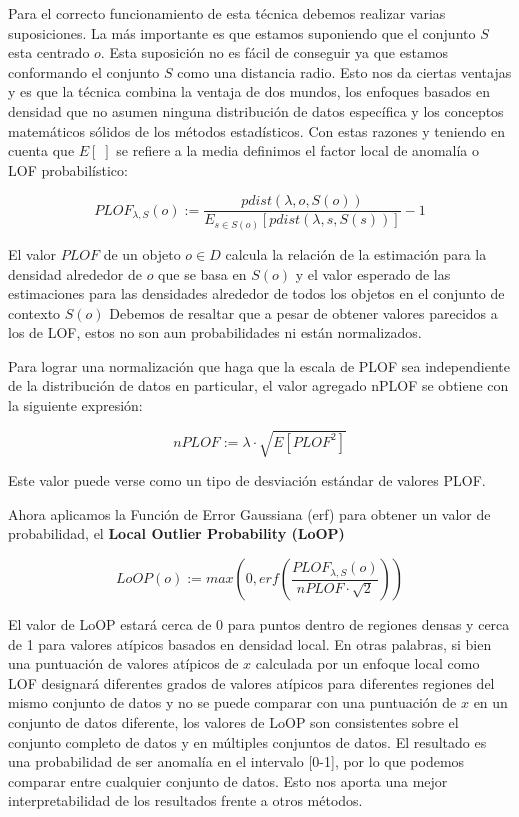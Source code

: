 Para el correcto funcionamiento de esta técnica debemos realizar varias suposiciones.
La más importante es que estamos suponiendo que el conjunto $S$ esta centrado $o$.
Esta suposición no es fácil de conseguir ya que estamos conformando el conjunto $S$
como una distancia radio. Esto nos da ciertas ventajas y es que la técnica combina
la ventaja de dos mundos, los enfoques basados en densidad que no asumen 
ninguna distribución de datos específica y los conceptos matemáticos 
sólidos de los métodos estadísticos. Con estas razones y teniendo en cuenta que 
$E[  \; ]$ se refiere a la media definimos el factor local de anomalía o LOF probabilístico:

\[ PLOF_{\lambda,S}(o) := \frac{pdist(\lambda,o,S(o))}{E_{s \in S(o)} [pdist(\lambda,s,S(s))]} -1 \] 


El valor $PLOF$ de un objeto $o \in D$ calcula la relación de la 
estimación para la densidad alrededor de $o$ que se basa en $S(o)$ 
y el valor esperado de las estimaciones para las densidades alrededor 
de todos los objetos en el conjunto de contexto $S(o)$
Debemos de resaltar que a pesar de obtener valores parecidos a los de LOF,
estos no son aun probabilidades ni están normalizados.

Para lograr una normalización que haga que la escala de PLOF sea 
independiente de la distribución de datos en particular, el valor 
agregado nPLOF se obtiene con la siguiente expresión:

\[ nPLOF := \lambda \cdot \sqrt{E[PLOF^2]}\]

Este valor puede verse como un tipo de desviación estándar de
valores PLOF.

Ahora aplicamos la Función de Error Gaussiana (erf) para obtener 
un valor de probabilidad, el \textbf{Local Outlier Probability (LoOP)}

\[ LoOP(o) := max ( 0, erf( \frac{PLOF_{\lambda,S}(o)}{nPLOF \cdot \sqrt{2}})    )\]


El valor de LoOP estará cerca de 0 para puntos dentro de regiones densas 
y cerca de 1 para valores atípicos basados en densidad local.
En otras palabras, si bien una puntuación de valores atípicos de $x$ 
calculada por un enfoque local como LOF designará diferentes grados 
de valores atípicos para diferentes regiones del mismo conjunto de 
datos y no se puede comparar con una puntuación de $x$ en un conjunto 
de datos diferente, los valores de LoOP son consistentes sobre el
conjunto completo de datos y en múltiples conjuntos de datos. El resultado
es una probabilidad de ser anomalía en el intervalo [0-1], por lo que 
podemos comparar entre cualquier conjunto de datos.
Esto nos aporta una mejor interpretabilidad de los resultados frente a otros
métodos.


